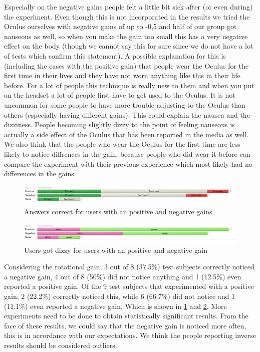 Especially on the negative gains people felt a little bit sick after (or even during) the experiment.
Even though this is not incorporated in the results we tried the Oculus ourselves with negative gains of up to -0,5 and half of our group got nauseous as well, so when you make the gain too small this has a very negative effect on the body (though we cannot say this for sure since we do not have a lot of tests which confirm this statement).
A possible explanation for this is (including the cases with the positive gain) that people wear the Oculus for the first time in their lives and they have not worn anything like this in their life before.
For a lot of people this technique is really new to them and when you put on the headset a lot of people first have to get used to the Oculus. 
It is not uncommon for some people to have more trouble adjusting to the Oculus than others (especially having different gains).
This could explain the nausea and the dizziness.
People becoming slightly dizzy to the point of feeling nauseous is actually a side effect of the Oculus that has been reported in the media as well.
We also think that the people who wear the Oculus  for the first time are less likely to notice diffrences in the gain, because people who did wear it before can compare the experiment with their previous experience which most likely had no differences in the gains. 
\begin{figure}[htb]
	\centering
	\includegraphics[width=\linewidth]{sections/finalreport/images/graph1.png}	
	\caption{Answers correct for users with an positive and negative gains}
	\label{fig:grp1}
\end{figure}
\begin{figure}[htb]
	\centering
	\includegraphics[width=\linewidth]{sections/finalreport/images/graph2.png}	
	\caption{Users got dizzy for users with an positive and negative gain}
	\label{fig:grp2}
\end{figure}
Considering the rotational gain, 3 out of 8 (37.5\%) test subjects correctly noticed a negative gain, 4 out of 8 (50\%) did not notice anything and 1 (12.5\%) even reported a positive gain.
Of the 9 test subjects that experimented with a positive gain, 2 (22.2\%) correctly noticed this, while 6 (66.7\%) did not notice and 1 (11.1\%) even reported a negative gain. Which is shown in  \ref{fig:grp1} and \ref{fig:grp2}.
More experiments need to be done to obtain statistically significant results.
From the face of these results, we could say that the negative gain is noticed more often, this is in accordance with our expectations.
We think the people reporting inverse results should be considered outliers.

